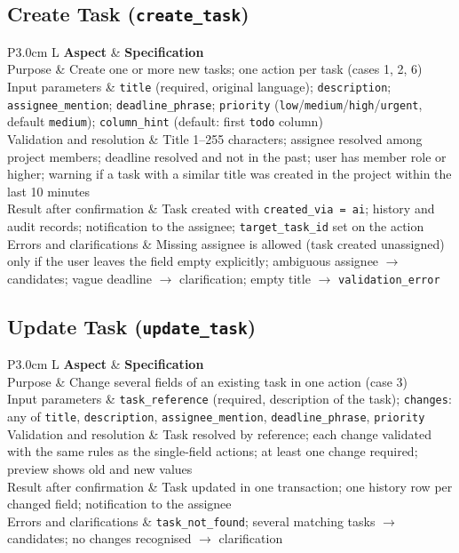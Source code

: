 \documentclass[11pt,a4paper]{article}
\newcommand{\tblstart}{\small\rowcolors{2}{gray!7}{white}}
\newcommand{\code}[1]{\texttt{#1}}
\begin{document}
\newcommand{\actionspec}[6]{%
\subsection{#1}
{\tblstart
\begin{xltabular}{\textwidth}{P{3.0cm} L}
\toprule
\textbf{Aspect} & \textbf{Specification} \\
\midrule
\endhead
Purpose & #2 \\
Input parameters & #3 \\
Validation and resolution & #4 \\
Result after confirmation & #5 \\
Errors and clarifications & #6 \\
\bottomrule
\end{xltabular}}}

\actionspec{Create Task (\code{create\_task})}
{Create one or more new tasks; one action per task (cases 1, 2, 6)}
{\code{title} (required, original language); \code{description}; \code{assignee\_mention}; \code{deadline\_phrase}; \code{priority} (\code{low}/\code{medium}/\code{high}/\code{urgent}, default \code{medium}); \code{column\_hint} (default: first \code{todo} column)}
{Title 1--255 characters; assignee resolved among project members; deadline resolved and not in the past; user has member role or higher; warning if a task with a similar title was created in the project within the last 10 minutes}
{Task created with \code{created\_via = ai}; history and audit records; notification to the assignee; \code{target\_task\_id} set on the action}
{Missing assignee is allowed (task created unassigned) only if the user leaves the field empty explicitly; ambiguous assignee $\rightarrow$ candidates; vague deadline $\rightarrow$ clarification; empty title $\rightarrow$ \code{validation\_error}}

\actionspec{Update Task (\code{update\_task})}
{Change several fields of an existing task in one action (case 3)}
{\code{task\_reference} (required, description of the task); \code{changes}: any of \code{title}, \code{description}, \code{assignee\_mention}, \code{deadline\_phrase}, \code{priority}}
{Task resolved by reference; each change validated with the same rules as the single-field actions; at least one change required; preview shows old and new values}
{Task updated in one transaction; one history row per changed field; notification to the assignee}
{\code{task\_not\_found}; several matching tasks $\rightarrow$ candidates; no changes recognised $\rightarrow$ clarification}
\end{document}
